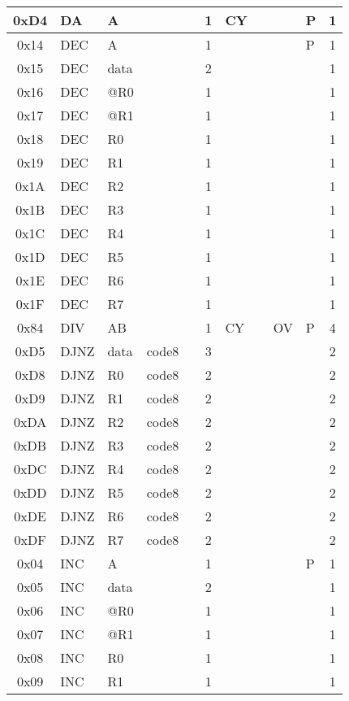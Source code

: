 \documentclass[a4paper,twoside,12pt]{book}
\begin{document}
{\begin{longtable}{|c|l|lll|c|llll|c|}
		0xD4	& DA	& A	&	&	& 1	& CY	&	&	& P	& 1	\\\hline
		0x14	& DEC	& A	&	&	& 1	&	&	&	& P	& 1	\\\hline
		0x15	& DEC	& data	&	&	& 2	&	&	&	&	& 1	\\\hline
		0x16	& DEC	& @R0	&	&	& 1	&	&	&	&	& 1	\\\hline
		0x17	& DEC	& @R1	&	&	& 1	&	&	&	&	& 1	\\\hline
		0x18	& DEC	& R0	&	&	& 1	&	&	&	&	& 1	\\\hline
		0x19	& DEC	& R1	&	&	& 1	&	&	&	&	& 1	\\\hline
		0x1A	& DEC	& R2	&	&	& 1	&	&	&	&	& 1	\\\hline
		0x1B	& DEC	& R3	&	&	& 1	&	&	&	&	& 1	\\\hline
		0x1C	& DEC	& R4	&	&	& 1	&	&	&	&	& 1	\\\hline
		0x1D	& DEC	& R5	&	&	& 1	&	&	&	&	& 1	\\\hline
		0x1E	& DEC	& R6	&	&	& 1	&	&	&	&	& 1	\\\hline
		0x1F	& DEC	& R7	&	&	& 1	&	&	&	&	& 1	\\\hline
		0x84	& DIV	& AB	&	&	& 1	& CY	&	& OV	& P	& 4	\\\hline
		0xD5	& DJNZ	& data	& code8	&	& 3	&	&	&	&	& 2	\\\hline
		0xD8	& DJNZ	& R0	& code8	&	& 2	&	&	&	&	& 2	\\\hline
		0xD9	& DJNZ	& R1	& code8	&	& 2	&	&	&	&	& 2	\\\hline
		0xDA	& DJNZ	& R2	& code8	&	& 2	&	&	&	&	& 2	\\\hline
		0xDB	& DJNZ	& R3	& code8	&	& 2	&	&	&	&	& 2	\\\hline
		0xDC	& DJNZ	& R4	& code8	&	& 2	&	&	&	&	& 2	\\\hline
		0xDD	& DJNZ	& R5	& code8	&	& 2	&	&	&	&	& 2	\\\hline
		0xDE	& DJNZ	& R6	& code8	&	& 2	&	&	&	&	& 2	\\\hline
		0xDF	& DJNZ	& R7	& code8	&	& 2	&	&	&	&	& 2	\\\hline
		0x04	& INC	& A	&	&	& 1	&	&	&	& P	& 1	\\\hline
		0x05	& INC	& data	&	&	& 2	&	&	&	&	& 1	\\\hline
		0x06	& INC	& @R0	&	&	& 1	&	&	&	&	& 1	\\\hline
		0x07	& INC	& @R1	&	&	& 1	&	&	&	&	& 1	\\\hline
		0x08	& INC	& R0	&	&	& 1	&	&	&	&	& 1	\\\hline
		0x09	& INC	& R1	&	&	& 1	&	&	&	&	& 1	\\\hline

\end{longtable}}
\end{document}
